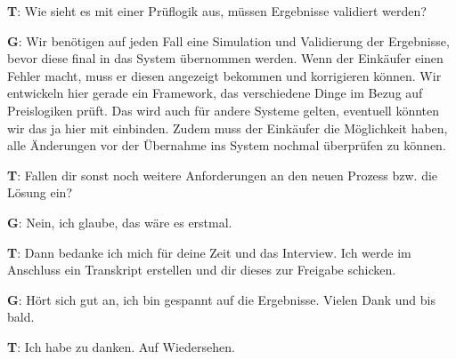 \begin{list}{X:}{\setlength{\labelsep}{5mm}}
 \item[\textbf{T}:] Wie sieht es mit einer Prüflogik aus, müssen Ergebnisse validiert werden?
 \item[\textbf{G}:] Wir benötigen auf jeden Fall eine Simulation und Validierung der Ergebnisse, bevor diese final in das System übernommen werden. Wenn der Einkäufer einen Fehler macht, muss er diesen angezeigt bekommen und korrigieren können. Wir entwickeln hier gerade ein Framework, das verschiedene Dinge im Bezug auf Preislogiken prüft. Das wird auch für andere Systeme gelten, eventuell könnten wir das ja hier mit einbinden. Zudem muss der Einkäufer die Möglichkeit haben, alle Änderungen vor der Übernahme ins System nochmal überprüfen zu können.
 \item[\textbf{T}:] Fallen dir sonst noch weitere Anforderungen an den neuen Prozess bzw. die Lösung ein?
 \item[\textbf{G}:] Nein, ich glaube, das wäre es erstmal.
 \item[\textbf{T}:] Dann bedanke ich mich für deine Zeit und das Interview. Ich werde im Anschluss ein Transkript erstellen und dir dieses zur Freigabe schicken.
 \item[\textbf{G}:] Hört sich gut an, ich bin gespannt auf die Ergebnisse. Vielen Dank und bis bald.
 \item[\textbf{T}:] Ich habe zu danken. Auf Wiedersehen.
\end{list}